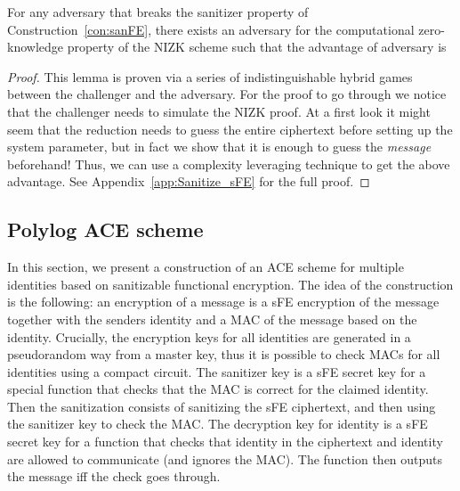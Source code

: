 \documentclass{llncs}
\begin{document}
\begin{lem}\label{lem:Sanitize_sFE}
For any adversary  that breaks the sanitizer property of Construction~\ref{con:sanFE}, there exists an adversary  for the computational zero-knowledge property of the NIZK scheme such that the advantage of adversary  is

\end{lem}


\begin{proof}
This lemma is proven via a series of indistinguishable hybrid games between the challenger and the adversary. For the proof to go through we notice that the challenger needs to simulate the NIZK proof. At a first look it might seem that the reduction needs to guess the entire ciphertext before setting up the system parameter, but in fact we show that it is enough to guess the \emph{message} beforehand! Thus, we can use a complexity leveraging technique to get the above advantage.
See Appendix~\ref{app:Sanitize_sFE} for the full proof.

\end{proof}



\subsection{Polylog ACE scheme}\label{sec:polylogace}

In this section, we present a construction of an ACE scheme for multiple identities based on sanitizable functional encryption. The idea of the construction is the following: an encryption of a message  is a sFE encryption of the message together with the senders identity  and a MAC of the message based on the identity. Crucially, the encryption keys for all identities are generated in a pseudorandom way from a master key, thus it is possible to check MACs for all identities using a compact circuit.
The sanitizer key is a sFE secret key for a special function that checks that the MAC is correct for the claimed identity. 
Then the sanitization consists of sanitizing the sFE ciphertext, and then using the sanitizer key to check the MAC.
The decryption key for identity  is a sFE secret key for a function that checks that identity  in the ciphertext and identity  are allowed to communicate (and ignores the MAC). The function then outputs the message iff the check goes through.
\end{document}
